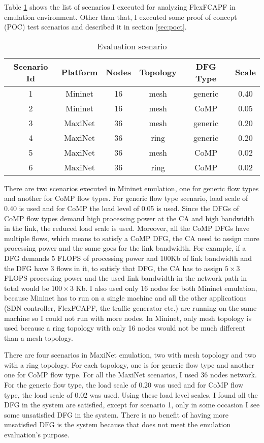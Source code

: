 Table \ref{tab:evalscen} shows the list of scenarios I executed for analyzing FlexFCAPF in emulation environment. Other than that, I executed some proof of concept (POC) test scenarios and described it in section \ref{sec:poct}.
\begin{table}[h!]
	\centering
	\caption{Evaluation scenario}
	\label{tab:evalscen}
	\begin{tabular}{|c||c|c|c|c|c|}
	\hline
	\textbf{Scenario Id} & \textbf{Platform} & \textbf{Nodes} & \textbf{Topology} & \textbf{DFG Type} & \textbf{Scale}\\
	\hline
	1 & Mininet & 16 & mesh & generic & 0.40\\
	\hline
	2 & Mininet & 16 & mesh & CoMP & 0.05\\
	\hline
	\hline
	3 & MaxiNet & 36 & mesh & generic & 0.20\\
	\hline
	4 & MaxiNet & 36 & ring & generic & 0.20\\
	\hline
	5 & MaxiNet & 36 & mesh & CoMP & 0.02\\
	\hline
	6 & MaxiNet & 36 & ring & CoMP & 0.02\\
	\hline
	\end{tabular}
\end{table}

There are two scenarios executed in Mininet emulation, one for generic flow types and another for CoMP flow types. For generic flow type scenario, load scale of 0.40 is used and for CoMP the load level of 0.05 is used. Since the DFGs of CoMP flow types demand high processing power at the CA and high bandwidth in the link, the reduced load scale is used. Moreover, all the CoMP DFGs have multiple flows, which means to satisfy a CoMP DFG, the CA need to assign more processing power and the same goes for the link bandwidth. For example, if a DFG demands 5 FLOPS of processing power and 100Kb of link bandwidth and the DFG have 3 flows in it, to satisfy that DFG, the CA has to assign $5 \times3$ FLOPS processing power and the used link bandwidth in the network path in total would be $100\times3$ Kb. I also used only 16 nodes for both Mininet emulation, because Mininet has to run on a single machine and all the other applications (SDN controller, FlexFCAPF, the traffic generator etc.) are running on the same machine so I could not run with more nodes. In Mininet, only mesh topology is used because a ring topology with only 16 nodes would not be much different than a mesh topology.

There are four scenarios in MaxiNet emulation, two with mesh topology and two with a ring topology. For each topology, one is for generic flow type and another one for CoMP flow type. For all the MaxiNet scenarios, I used 36 nodes network. For the generic flow type, the load scale of 0.20 was used and for CoMP flow type, the load scale of 0.02 was used. Using these load level scales, I found all the DFG in the system are satisfied, except for scenario 1, only in some occasion I see some unsatisfied DFG in the system. There is no benefit of having more unsatisfied DFG is the system because that does not meet the emulation evaluation's purpose.


